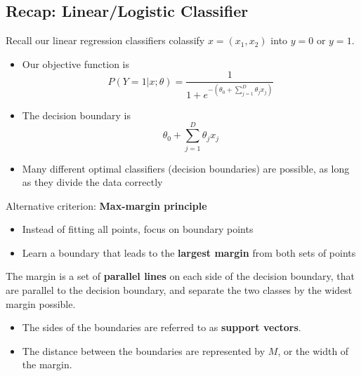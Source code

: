 \documentclass[10pt]{article}
\begin{document}
\subsection*{Recap: Linear/Logistic Classifier}
Recall our linear regression classifiers colassify $x = (x_1, x_2)$ into $y = 0$ or $y = 1$.
\begin{itemize}
	\item Our objective function is
	\[P(Y = 1 | x; \theta) = \frac{1}{1 + e^{-\left(\theta_0 + \sum_{j = 1}^D \theta_j x_j\right)}}\]
    \item The decision boundary is
    \[\theta_0 + \sum_{j = 1}^D \theta_j x_j\]
    \item Many different optimal classifiers (decision boundaries) are possible, as long as they divide the data correctly
\end{itemize}
Alternative criterion: \textbf{Max-margin principle}
\begin{itemize}
	\item Instead of fitting all points, focus on boundary points
	\item Learn a boundary that leads to the \textbf{largest margin} from both sets of points
\end{itemize}
The margin is a set of \textbf{parallel lines} on each side of the decision boundary, that are parallel to the decision boundary, and separate the two classes by the widest margin possible.
\begin{itemize}
	\item The sides of the boundaries are referred to as \textbf{support vectors}.
	\item The distance between the boundaries are represented by $M$, or the width of the margin.
\end{itemize}
\end{document}
